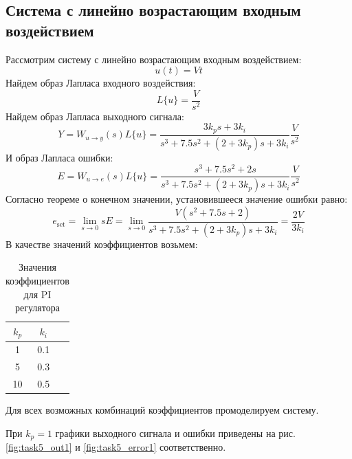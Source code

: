 \subsection{Система с линейно возрастающим входным воздействием}
Рассмотрим систему с линейно возрастающим входным воздействием:
\begin{equation}
    u(t) = Vt
\end{equation}
Найдем образ Лапласа входного воздействия:
\begin{equation}
    L\{u\} = \frac{V}{s^2}
\end{equation}
Найдем образ Лапласа выходного сигнала:
\begin{equation}
    Y = W_{u\rightarrow y}(s)L\{u\} = \frac{3k_p s + 3k_i}{s^3 + 7.5s^2 + (2 + 3k_p)s + 3k_i}\frac{V}{s^2}
\end{equation}
И образ Лапласа ошибки:
\begin{equation}
    E = W_{u\rightarrow e}(s)L\{u\} = \frac{s^3 + 7.5s^2 + 2s}{s^3 + 7.5s^2 + (2 + 3k_p)s + 3k_i}\frac{V}{s^2}
\end{equation}
Согласно теореме о конечном значении, установившееся значение ошибки равно:
\begin{equation}
    e_{\text{set}} = \lim_{s \to 0} sE = \lim_{s \to 0} \frac{V(s^2 + 7.5s + 2)}{s^3 + 7.5s^2 + (2 + 3k_p)s + 3k_i} = \frac{2V}{3k_i}
\end{equation}
В качестве значений коэффициентов возьмем:
\begin{table}[ht!]
    \centering
    \begin{tabular}{|c|c|c|}
        \hline
        $k_p$ & $k_i$  \\
        \hline
        1 & 0.1 \\
        5 & 0.3 \\
        10 & 0.5 \\
        \hline
    \end{tabular}
    \caption{Значения коэффициентов для PI регулятора}
    \label{tab:task5}
\end{table}

Для всех возможных комбинаций коэффициентов промоделируем систему. 

При $k_p = 1$ графики выходного сигнала и ошибки приведены
на рис. \ref{fig:task5_out1} и \ref{fig:task5_error1} соответственно.

